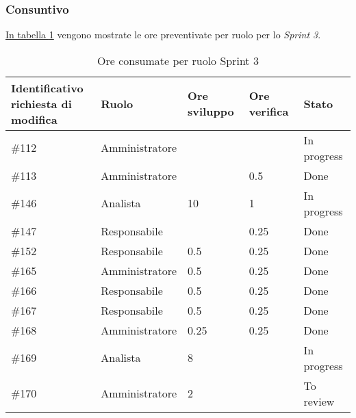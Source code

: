 \subsubsection{Consuntivo}

\hyperref[tab:sprint3_ore_consumate]{In tabella \ref{tab:sprint3_ore_consumate}} vengono mostrate le ore preventivate per ruolo per lo \textit{Sprint 3}.

\begin{table}[H]
    \centering
    \begin{tabular}{| l | l | l | l | l |}
        \hline
            \makecell{\textbf{Identificativo} \\ \textbf{richiesta di modifica}} &
            \textbf{Ruolo} & 
            \textbf{Ore sviluppo} &
            \textbf{Ore verifica} & 
            \textbf{Stato}\\ 
        \hline
            \#112 & Amministratore &  & & In progress\\
        \hline
            \#113 & Amministratore &  & 0.5 & Done\\
        \hline
            \#146 & Analista & 10 & 1 & In progress\\
        \hline
            \#147 & Responsabile &  & 0.25 & Done \\
        \hline
            \#152 & Responsabile & 0.5 & 0.25 & Done\\
        \hline
            \#165 & Amministratore & 0.5 & 0.25 & Done\\
        \hline
            \#166 & Responsabile & 0.5 & 0.25 & Done\\
        \hline
            \#167 & Responsabile & 0.5 & 0.25 & Done\\
        \hline
            \#168 & Amministratore & 0.25 & 0.25 & Done\\
        \hline
            \#169 & Analista & 8 & & In progress\\
        \hline
            \#170 & Amministratore & 2 & & To review\\
        \hline
    \end{tabular}
    \caption{Ore consumate per ruolo Sprint 3}
    \label{tab:sprint3_ore_consumate} 
\end{table}